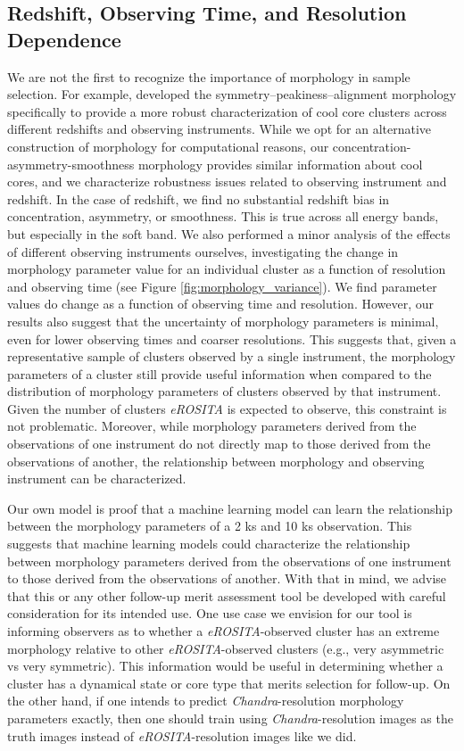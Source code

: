 \documentclass[twocolumn, 11pt]{aastex63}%
\begin{document}
\subsection{Redshift, Observing Time, and Resolution Dependence}\label{biases}
We are not the first to recognize the importance of morphology in sample selection.  For example, \citet{Mantz_2015} developed the symmetry–peakiness–alignment morphology specifically to provide a more robust characterization of cool core clusters across different redshifts and observing instruments. While we opt for an alternative construction of morphology for computational reasons, our concentration-asymmetry-smoothness morphology provides similar information about cool cores, and we characterize robustness issues related to observing instrument and redshift. In the case of redshift, we find no substantial redshift bias in concentration, asymmetry, or smoothness. This is true across all energy bands, but especially in the soft band. We also performed a minor analysis of the effects of different observing instruments ourselves, investigating the change in morphology parameter value for an individual cluster as a function of resolution and observing time (see Figure \ref{fig:morphology_variance}). We find parameter values do change as a function of observing time and resolution. However, our results also suggest that the uncertainty of morphology parameters is minimal, even for lower observing times and coarser resolutions. This suggests that, given a representative sample of clusters observed by a single instrument, the morphology parameters of a cluster still provide useful information when compared to the distribution of morphology parameters of clusters observed by that instrument. Given the number of clusters \textit{eROSITA} is expected to observe, this constraint is not problematic. Moreover, while morphology parameters derived from the observations of one instrument do not directly map to those derived from the observations of another, the relationship between morphology and observing instrument can be characterized. 

Our own model is proof that a machine learning model can learn the relationship between the morphology parameters of a 2 ks and 10 ks observation. This suggests that machine learning models could characterize the relationship between morphology parameters derived from the observations of one instrument to those derived from the observations of another. With that in mind, we advise that this or any other follow-up merit assessment tool be developed with careful consideration for its intended use. One use case we envision for our tool is informing observers as to whether a \textit{eROSITA}-observed cluster has an extreme morphology relative to other \textit{eROSITA}-observed clusters (e.g., very asymmetric vs very symmetric). This information would be useful in determining whether a cluster has a dynamical state or core type that merits selection for follow-up. On the other hand, if one intends to predict \textit{Chandra}-resolution morphology parameters exactly, then one should train using \textit{Chandra}-resolution images as the truth images instead of \textit{eROSITA}-resolution images like we did.
\end{document}
